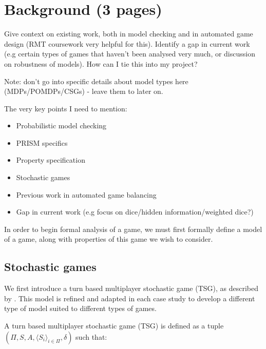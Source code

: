 
\chapter{Background (3 pages)}

Give context on existing work, both in model checking and in automated game design (RMT coursework very helpful for this). Identify a gap in current work (e.g certain types of games that haven't been analysed very much, or discussion on robustness of models). How can I tie this into my project?

Note: don't go into specific details about model types here (MDPs/POMDPs/CSGs) - leave them to later on.

The very key points I need to mention:

\begin{itemize}
    \item Probabilistic model checking
    \item PRISM specifics
    \item Property specification
    \item Stochastic games
    \item Previous work in automated game balancing
    \item Gap in current work (e.g focus on dice/hidden information/weighted dice?)
\end{itemize}

In order to begin formal analysis of a game, we must first formally define a model of a game, along with properties of this game we wish to consider.

\section{Stochastic games}

We first introduce a turn based multiplayer stochastic game (TSG), as described by \cite{kavanagh_balancing_2019}. This model is refined and adapted in each case study to develop a different type of model suited to different types of games.

A turn based multiplayer stochastic game (TSG) is defined as a tuple $(\Pi, S, A, \langle S_i \rangle_{i \in \Pi}, \delta)$ such that:

